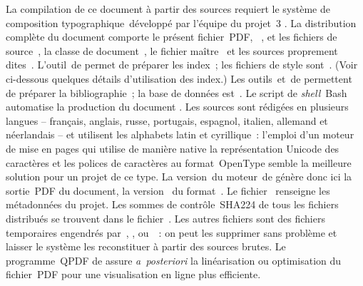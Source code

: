 La compilation de ce document à partir des sources requiert le système de
composition typographique~\Latex développé par l'équipe du projet~\Latex{}3
\citep{LaTeX}.
La distribution complète du document comporte le présent fichier~PDF,
\cad~, et les fichiers de source~\Latex, \cad la classe de
document~, le fichier maître~ et les
sources proprement dites~.
L'outil~\Xindy de \citet{Xindy} permet de préparer les index~; les fichiers
de style sont~.
(Voir ci-dessous quelques détails d'utilisation des index.)
Les outils~\Biber et~\Biblatex de \citet{Lehman} permettent de préparer la
bibliographie~; la base de données est~.
Le script de \emph{shell}~Bash~ automatise la production du
document \citep{Bash}.
Les sources sont rédigées en plusieurs langues -- français, anglais, russe,
portugais, espagnol, italien, allemand et néerlandais -- et utilisent les
alphabets latin et cyrillique~: l'emploi d'un moteur de mise en pages qui
utilise de manière native la représentation Unicode des caractères et les
polices de caractères au format~OpenType semble la meilleure solution pour
un projet de ce type.
La version~\engversion du moteur~\engname de \citet{LuaTeX} génère donc ici
la sortie~PDF du document, \via la version~\fmtversion{} du format~\Latex.
Le fichier~ renseigne les méta\-données du projet.
Les sommes de contrôle~SHA224 \citep{SHA} de tous les fichiers distribués se
trouvent dans le fichier~.
Les autres fichiers sont des fichiers temporaires engendrés par~\engname,
\Biber, \Biblatex ou~\Xindy~: on peut les supprimer sans problème et laisser
le système les reconstituer à partir des sources brutes.
Le programme~QPDF de \citet{Berkenbilt} assure \emph{a~posteriori} la
linéarisation ou optimisation du fichier~PDF pour une visualisation en ligne
plus efficiente.

